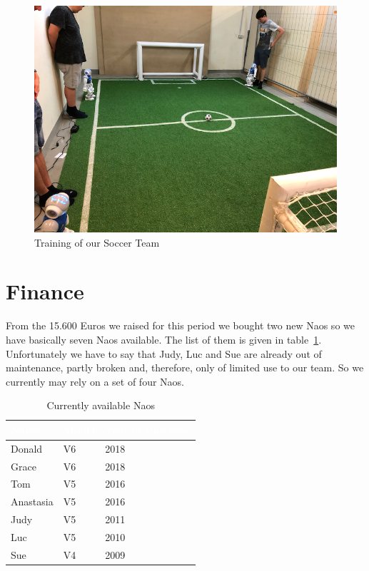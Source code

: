\documentclass[11pt]{article}
\begin{document}
\begin{figure}
\begin{center}
\includegraphics[scale=0.38]{img/soccerTraining.png}
\end{center}
\caption{Training of our Soccer Team}
\label{fig:soccerTraining}
\end{figure}

\section{Finance}
From the 15.600 Euros we raised for this period we bought two new Naos so we have basically seven Naos available. The list of them is given in table~\ref{tab:naos}. Unfortunately we have to say that Judy, Luc and Sue are already out of maintenance, partly broken and, therefore, only of limited use to our team. So we currently may rely on a set of four Naos.

\begin{table}
\begin{center}
\begin{tabular}{|p{.3\linewidth}|p{.1\linewidth}|p{.2\linewidth}|}
\hline
\cellcolor{gray!100}\textcolor{white}{Name} & \cellcolor{gray!100}\textcolor{white}{Model} & \cellcolor{gray!100}\textcolor{white}{Year of Purchase} \\ \hline
Donald & V6 & 2018 \\ \hline
Grace & V6 & 2018 \\ \hline
Tom & V5 & 2016 \\ \hline
Anastasia & V5 & 2016 \\ \hline
Judy & V5 & 2011 \\ \hline
Luc & V5 & 2010 \\ \hline
Sue & V4 & 2009 \\ \hline
\end{tabular}
\end{center}
\caption{Currently available Naos}
\label{tab:naos}
\end{table}
\end{document}

